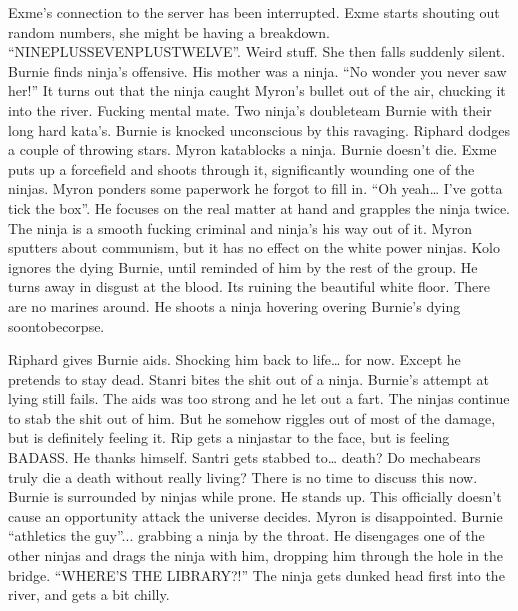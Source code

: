 Exme’s connection to the server has been interrupted. Exme starts shouting out random numbers, she might be having a breakdown. “NINEPLUSSEVENPLUSTWELVE”. Weird stuff. She then falls suddenly silent. Burnie finds ninja’s offensive. His mother was a ninja. “No wonder you never saw her!” It turns out that the ninja caught Myron’s bullet out of the air, chucking it into the river. Fucking mental mate. Two ninja’s doubleteam Burnie with their long hard kata’s. Burnie is knocked unconscious by this ravaging. Riphard dodges a couple of throwing stars. Myron katablocks a ninja. Burnie doesn’t die. Exme puts up a forcefield and shoots through it, significantly wounding one of the ninjas. Myron ponders some paperwork he forgot to fill in. “Oh yeah… I’ve gotta tick the box”. He focuses on the real matter at hand and grapples the ninja twice. The ninja is a smooth fucking criminal and ninja’s his way out of it. Myron sputters about communism, but it has no effect on the white power ninjas. Kolo ignores the dying Burnie, until reminded of him by the rest of the group. He turns away in disgust at the blood. Its ruining the beautiful white floor. There are no marines around. He shoots a ninja hovering overing Burnie’s dying soontobecorpse.\medskip

Riphard gives Burnie aids. Shocking him back to life… for now. Except he pretends to stay dead. Stanri bites the shit out of a ninja. Burnie’s attempt at lying still fails. The aids was too strong and he let out a fart. The ninjas continue to stab the shit out of him. But he somehow riggles out of most of the damage, but is definitely feeling it. Rip gets a ninjastar to the face, but is feeling BADASS. He thanks himself. Santri gets stabbed to… death? Do mechabears truly die a death without really living? There is no time to discuss this now. Burnie is surrounded by ninjas while prone. He stands up. This officially doesn’t cause an opportunity attack the universe decides. Myron is disappointed. Burnie “athletics the guy”... grabbing a ninja by the throat. He disengages one of the other ninjas and drags the ninja with him, dropping him through the hole in the bridge. “WHERE’S THE LIBRARY?!” The ninja gets dunked head first into the river, and gets a bit chilly.\medskip

